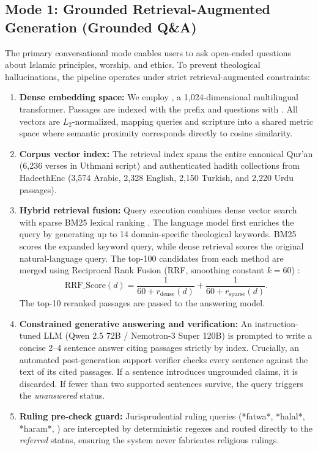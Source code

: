 \subsection{Mode 1: Grounded Retrieval-Augmented Generation (Grounded Q\&A)}
\label{sec:mode_rag}
The primary conversational mode enables users to ask open-ended questions about Islamic principles, worship, and ethics. To prevent theological hallucinations, the pipeline operates under strict retrieval-augmented constraints:
\begin{enumerate}[leftmargin=*,itemsep=2pt]
  \item \textbf{Dense embedding space:} We employ  \cite{me5}, a 1,024-dimensional multilingual transformer. Passages are indexed with the prefix  and questions with . All vectors are $L_2$-normalized, mapping queries and scripture into a shared metric space where semantic proximity corresponds directly to cosine similarity.
  \item \textbf{Corpus vector index:} The retrieval index spans the entire canonical Qur'an (6,236 verses in Uthmani script) and authenticated hadith collections from HadeethEnc (3,574 Arabic, 2,328 English, 2,150 Turkish, and 2,220 Urdu passages).
  \item \textbf{Hybrid retrieval fusion:} Query execution combines dense vector search with sparse BM25 lexical ranking \cite{bm25}. The language model first enriches the query by generating up to 14 domain-specific theological keywords. BM25 scores the expanded keyword query, while dense retrieval scores the original natural-language query. The top-100 candidates from each method are merged using Reciprocal Rank Fusion (RRF, smoothing constant $k{=}60$) \cite{rrf}:
  \begin{equation}
    \mathrm{RRF\_Score}(d) = \frac{1}{60 + r_{\text{dense}}(d)} + \frac{1}{60 + r_{\text{sparse}}(d)}.
  \end{equation}
  The top-10 reranked passages are passed to the answering model.
  \item \textbf{Constrained generative answering and verification:} An instruction-tuned LLM (Qwen 2.5 72B / Nemotron-3 Super 120B) is prompted to write a concise 2--4 sentence answer citing passages strictly by index. Crucially, an automated post-generation support verifier checks every sentence against the text of its cited passages. If a sentence introduces ungrounded claims, it is discarded. If fewer than two supported sentences survive, the query triggers the \emph{unanswered} status.
  \item \textbf{Ruling pre-check guard:} Jurisprudential ruling queries (*fatwa*, *halal*, *haram*, ) are intercepted by deterministic regexes and routed directly to the \emph{referred} status, ensuring the system never fabricates religious rulings.
\end{enumerate}

